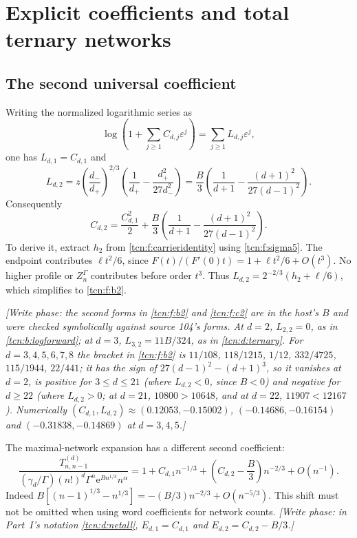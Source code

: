 \documentclass[11pt,letterpaper]{article}
\newcommand{\eps}{\varepsilon}
\newcommand{\ee}{\mathrm e}
\theoremstyle{remark}
\begin{document}
\section{Explicit coefficients and total ternary networks}\label{tcn:f:sec:coefficients}
\subsection{The second universal coefficient}
Writing the normalized logarithmic series as
\[
 \log\left(1+\sum_{j\ge1}C_{d,j}\eps^j\right)
 =\sum_{j\ge1}L_{d,j}\eps^j,
\]
one has $L_{d,1}=C_{d,1}$ and
\begin{equation}\label{tcn:f:b2}
 L_{d,2}=z\left(\frac{d_-}{d_+}\right)^{2/3}\left(\frac1{d_+}-\frac{d_+^2}{27d_-^2}\right)
 =\frac B3\left(\frac1{d+1}-\frac{(d+1)^2}{27(d-1)^2}\right).
\end{equation}
Consequently
\begin{equation}\label{tcn:f:c2}
 C_{d,2}=\frac{C_{d,1}^2}{2}
       +\frac B3\left(\frac1{d+1}-\frac{(d+1)^2}{27(d-1)^2}\right).
\end{equation}
To derive it, extract $h_2$ from \eqref{tcn:f:carrieridentity} using \eqref{tcn:f:sigma5}. The endpoint contributes $\ell t^2/6$, since $F(t)/(F'(0)t)=1+\ell t^2/6+O(t^3)$. No higher profile or $Z^\Gamma_n$ contributes before order $t^3$. Thus $L_{d,2}=2^{-2/3}(h_2+\ell/6)$, which simplifies to \eqref{tcn:f:b2}.

\emph{[Write phase: the second forms in \eqref{tcn:f:b2} and \eqref{tcn:f:c2} are in the host's $B$ and were checked symbolically against source 104's forms. At $d=2$, $L_{2,2}=0$, as in \eqref{tcn:b:logforward}; at $d=3$, $L_{3,2}=11B/324$, as in \eqref{tcn:d:ternary}. For $d=3,4,5,6,7,8$ the bracket in \eqref{tcn:f:b2} is $11/108$, $118/1215$, $1/12$, $332/4725$, $115/1944$, $22/441$; it has the sign of $27(d-1)^2-(d+1)^3$, so it vanishes at $d=2$, is positive for $3\le d\le21$ (where $L_{d,2}<0$, since $B<0$) and negative for $d\ge22$ (where $L_{d,2}>0$; at $d=21$, $10800>10648$, and at $d=22$, $11907<12167$). Numerically $(C_{d,1},L_{d,2})\approx(0.12053,-0.15002)$, $(-0.14686,-0.16154)$ and $(-0.31838,-0.14869)$ at $d=3,4,5$.]}

The maximal-network expansion has a different second coefficient:
\begin{equation}\label{tcn:f:maximalfirsttwo}
 \frac{T^{(d)}_{n,n-1}}{(\gamma_d/\Gamma)(n!)^d\Gamma^n\ee^{Bn^{1/3}}n^\alpha}
 =1+C_{d,1}n^{-1/3}+\left(C_{d,2}-\frac B3\right)n^{-2/3}+O(n^{-1}).
\end{equation}
Indeed $B[(n-1)^{1/3}-n^{1/3}]=-(B/3)n^{-2/3}+O(n^{-5/3})$. This shift must not be omitted when using word coefficients for network counts. \emph{[Write phase: in Part~I's notation \eqref{tcn:d:netall}, $E_{d,1}=C_{d,1}$ and $E_{d,2}=C_{d,2}-B/3$.]}
\end{document}
